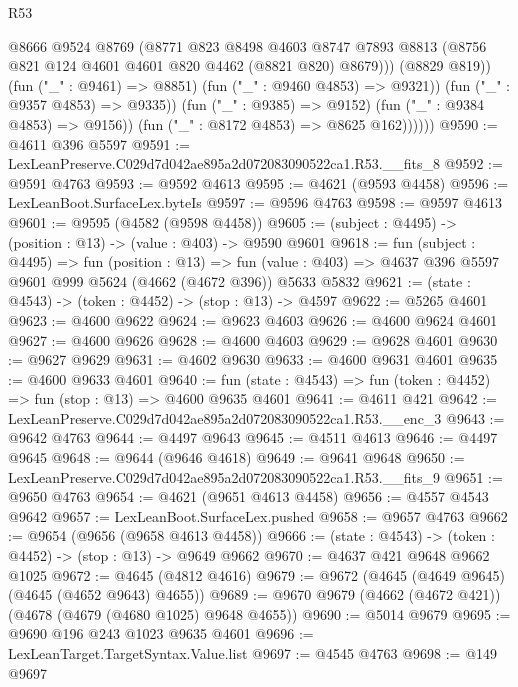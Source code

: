 \begin{lexlean}{R53}
\begin{coremodule}
                        @8666
                        @9524
                        @8769
                        (@8771
                          @823
                          @8498
                          @4603
                          @8747
                          @7893
                          @8813
                          (@8756 @821 @124 @4601 @4601 @820 @4462 (@8821 @820) @8679)))
                      (@8829 @819))
                    (fun ("_" : @9461) => @8851)
                    (fun ("_" : @9460 @4853) => @9321))
                  (fun ("_" : @9357 @4853) => @9335))
                (fun ("_" : @9385) => @9152)
                (fun ("_" : @9384 @4853) => @9156))
              (fun ("_" : @8172 @4853) => @8625 @162))))))
@9590 := @4611 @396 @5597
@9591 := LexLeanPreserve.C029d7d042ae895a2d072083090522ca1.R53.__fits_8
@9592 := @9591 @4763
@9593 := @9592 @4613
@9595 := @4621 (@9593 @4458)
@9596 := LexLeanBoot.SurfaceLex.byteIs
@9597 := @9596 @4763
@9598 := @9597 @4613
@9601 := @9595 (@4582 (@9598 @4458))
@9605 := (subject : @4495) -> (position : @13) -> (value : @403) -> @9590 @9601
@9618 := fun (subject : @4495) =>
  fun (position : @13) =>
  fun (value : @403) => @4637 @396 @5597 @9601 @999 @5624 (@4662 (@4672 @396)) @5633 @5832
@9621 := (state : @4543) -> (token : @4452) -> (stop : @13) -> @4597
@9622 := @5265 @4601
@9623 := @4600 @9622
@9624 := @9623 @4603
@9626 := @4600 @9624 @4601
@9627 := @4600 @9626
@9628 := @4600 @4603
@9629 := @9628 @4601
@9630 := @9627 @9629
@9631 := @4602 @9630
@9633 := @4600 @9631 @4601
@9635 := @4600 @9633 @4601
@9640 := fun (state : @4543) => fun (token : @4452) => fun (stop : @13) => @4600 @9635 @4601
@9641 := @4611 @421
@9642 := LexLeanPreserve.C029d7d042ae895a2d072083090522ca1.R53.__enc_3
@9643 := @9642 @4763
@9644 := @4497 @9643
@9645 := @4511 @4613
@9646 := @4497 @9645
@9648 := @9644 (@9646 @4618)
@9649 := @9641 @9648
@9650 := LexLeanPreserve.C029d7d042ae895a2d072083090522ca1.R53.__fits_9
@9651 := @9650 @4763
@9654 := @4621 (@9651 @4613 @4458)
@9656 := @4557 @4543 @9642
@9657 := LexLeanBoot.SurfaceLex.pushed
@9658 := @9657 @4763
@9662 := @9654 (@9656 (@9658 @4613 @4458))
@9666 := (state : @4543) -> (token : @4452) -> (stop : @13) -> @9649 @9662
@9670 := @4637 @421 @9648 @9662 @1025
@9672 := @4645 (@4812 @4616)
@9679 := @9672 (@4645 (@4649 @9645) (@4645 (@4652 @9643) @4655))
@9689 := @9670 @9679 (@4662 (@4672 @421)) (@4678 (@4679 (@4680 @1025) @9648 @4655))
@9690 := @5014 @9679
@9695 := @9690 @196 @243 @1023 @9635 @4601
@9696 := LexLeanTarget.TargetSyntax.Value.list
@9697 := @4545 @4763
@9698 := @149 @9697

\end{coremodule}
\end{lexlean}

